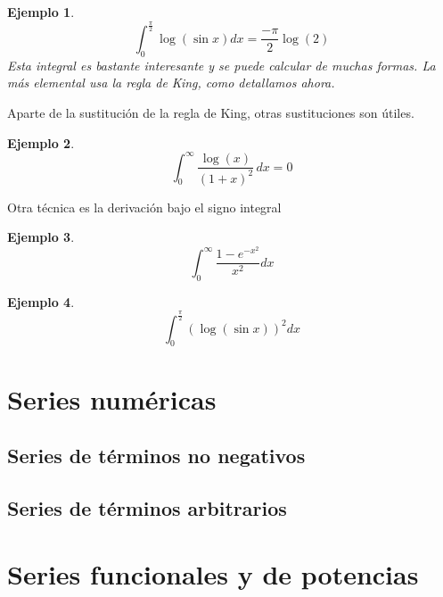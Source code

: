 \documentclass{article}
\newtheorem{ejem}{Ejemplo}
\begin{document}
\begin{ejem}
	\begin{equation*}
		\int_0^{\frac{\pi}{2}} \log(\sin x)dx = \frac{-\pi}{2} \log(2)
	\end{equation*}
	Esta integral es bastante interesante y se puede calcular de muchas formas. La más elemental usa la regla de King, como detallamos ahora.
\end{ejem}

Aparte de la sustitución de la regla de King, otras sustituciones son útiles.

\begin{ejem}
	\begin{equation*}
		\int_0^{\infty} \frac{\log(x)}{(1+x)^2} \,dx = 0
	\end{equation*}
\end{ejem}

Otra técnica es la derivación bajo el signo integral


\begin{ejem}
	\begin{equation*}
		\int_0^{\infty} \frac{1 - e^{-x^2}}{x^2} dx
	\end{equation*}
\end{ejem}

\begin{ejem}
	\begin{equation*}
		\int_0^{\frac{\pi}{2}} (\log(\sin x))^2 dx
	\end{equation*}
\end{ejem}

\section{Series numéricas}

\subsection{Series de términos no negativos}

\subsection{Series de términos arbitrarios}





\section{Series funcionales y de potencias}
\end{document}
